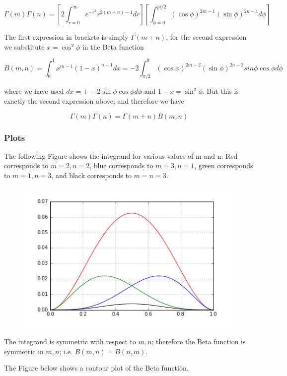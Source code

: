 \[
\Gamma(m) \Gamma(n) = \left[ 2 \int_{r=0}^\infty e^{-r^2} r^{2(m+n)-1} dr \right] \left[  \int_{\phi=0}^{pi/2}   (\cos \phi)^{2m-1} (\sin \phi)^{2n-1} d \phi \right]
\]

The first expression in brackets is simply \(\Gamma(m+n)\), for the
second expression we substitute \(x=\cos^2 \phi\) in the Beta function

\[
B(m,n) = \int_0^1 x^{m-1} (1-x)^{n-1} dx = -2 \int_{\pi/2}^0 (\cos \phi)^{2m-2} (\sin \phi)^{2n-2} sin\phi \cos\phi d\phi
\]

where we have used \(dx =+ -2 \sin \phi \cos \phi d \phi\) and
\(1 - x = \sin^2 \phi\). But this is exactly the second expression
above; and therefore we have

\[
\Gamma(m) \Gamma(n) = \Gamma(m+n) B(m,n)
\]

\subsubsection{Plots}

The following Figure shows the integrand for various values of m and n:
Red corresponds to \(m=2, n=2\), blue corresponds to \(m=3, n=1\), green
corresponds to \(m=1, n=3\), and black corresponds to \(m=n=3\).

\begin{figure}[H]
\centering
\includegraphics{images/interesting_integrals_05_2.png}

\end{figure}

The integrand is symmetric with respect to \(m,n\); therefore the Beta
function is symmetric in \(m,n\); i.e. \(B(m,n) = B(n,m)\).

The Figure below shows a contour plot of the Beta function.

